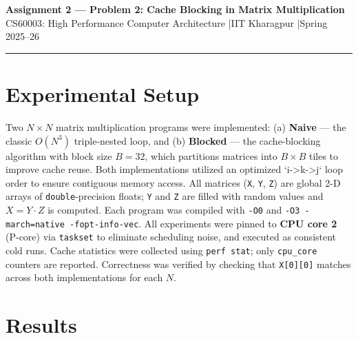 \documentclass[10pt,a4paper]{article}
\begin{document}
\begin{center}
    {\Large \textbf{Assignment 2 --- Problem 2: Cache Blocking in Matrix Multiplication}}\\[3pt]
    {\normalsize CS60003: High Performance Computer Architecture \quad|\quad IIT Kharagpur \quad|\quad Spring 2025--26}
\end{center}

\vspace{2pt}
\hrule
\vspace{4pt}

\section{Experimental Setup}

Two $N \times N$ matrix multiplication programs were implemented: (a) \textbf{Naive} --- the
classic $O(N^3)$ triple-nested loop, and (b) \textbf{Blocked} --- the cache-blocking algorithm
with block size $B=32$, which partitions matrices into $B \times B$ tiles to improve cache reuse.
Both implementations utilized an optimized `i->k->j` loop order to ensure contiguous memory access.
All matrices (\texttt{X}, \texttt{Y}, \texttt{Z}) are global 2-D arrays of \texttt{double}-precision
floats; \texttt{Y} and \texttt{Z} are filled with random values and $X = Y \cdot Z$ is computed.
Each program was compiled with \texttt{-O0} and \texttt{-O3 -march=native -fopt-info-vec}.
All experiments were pinned to \textbf{CPU core 2} (P-core) via \texttt{taskset} to eliminate
scheduling noise, and executed as consistent cold runs. Cache statistics were collected using 
\texttt{perf stat}; only \texttt{cpu\_core} counters are reported. Correctness was verified by 
checking that \texttt{X[0][0]} matches across both implementations for each $N$.

\vspace{4pt}
\section{Results}
\end{document}
